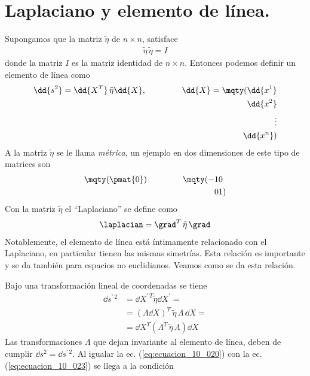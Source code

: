 \section{Laplaciano y elemento de línea.}
Supongamos que la matriz $\tilde{\eta}$ de $n \times n$, satisface
\begin{align}
\tilde{\eta} \, \tilde{\eta} = I
\label{eq:ecuacion_10_019}
\end{align}
donde la matriz $I$ es la matriz identidad de $n \times n$. Entonces podemos definir un elemento de línea como
\begin{align}
\dd{s^{2}} = \dd{X^{T}} \, \tilde{\eta} \dd{X}, \hspace{1.5cm} \dd{X} = \mqty(\dd{x^{1}} \\ \dd{x^{2}} \\ \vdots \\ \dd{x^{n}})
\label{eq:ecuacion_10_020}
\end{align}
A la matriz $\tilde{\eta}$ se le llama \emph{métrica}, un ejemplo en dos dimensiones de este tipo de matrices son
\begin{align}
\mqty(\pmat{0}) \hspace{1.5cm} \mqty(-1 & 0 \\ 0 & 1)
\label{eq:ecuacion_10_021}
\end{align}
Con la matriz $\tilde{\eta}$ el \enquote{Laplaciano} se define como
\begin{align}
\laplacian = \grad^{T} \, \tilde{\eta} \, \grad
\label{eq:ecuacion_10_022}
\end{align}
Notablemente, el elemento de línea está íntimamente relacionado con el Laplaciano, en particular tienen las mismas simetrías. Esta relación es importante
y se da también para espacios no euclidianos. Veamos como se da esta relación.
\par
Bajo una transformación lineal de coordenadas se tiene
\begin{align}
\dd{s^{\prime \, 2}} &= \dd{X^{\prime \, T}} \tilde{\eta} \dd{X^{\prime}} = \nonumber \\[0.5em]
&= \left(\Lambda \dd{X} \right)^{T} \, \tilde{\eta} \, \Lambda \, \dd{X} = \nonumber \\[0.5em]
&= \dd{X^{T}} \left( \Lambda^{T} \, \tilde{\eta} \, \Lambda \right) \dd{X}
\label{eq:ecuacion_10_023}
\end{align}
Las transformaciones $\Lambda$ que dejan invariante al elemento de línea, deben de cumplir $\dd{s^{2}} = \dd{s^{\prime \, 2}}$. Al igualar la ec. (\ref{eq:ecuacion_10_020}) con la ec. (\ref{eq:ecuacion_10_023}) se llega a la condición 
